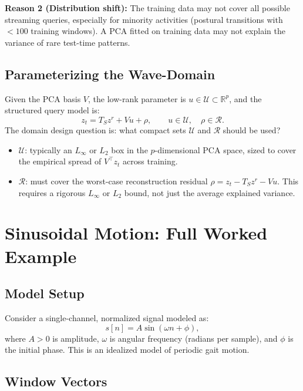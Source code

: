 \documentclass[11pt, a4paper]{article}
\theoremstyle{definition}
\theoremstyle{plain}
\newcommand{\R}{\mathbb{R}}
\begin{document}
\textbf{Reason 2 (Distribution shift):} The training data may not cover all possible
streaming queries, especially for minority activities (postural transitions with
$< 100$ training windows). A PCA fitted on training data may not explain the variance
of rare test-time patterns.

\subsection{Parameterizing the Wave-Domain}

Given the PCA basis $V$, the low-rank parameter is $u \in \mathcal{U} \subset \R^p$,
and the structured query model is:
\[
  z_t = T_S z^r + Vu + \rho, \qquad u \in \mathcal{U}, \quad \rho \in \mathcal{R}.
\]
The domain design question is: what compact sets $\mathcal{U}$ and $\mathcal{R}$ should be used?

\begin{itemize}[leftmargin=1.5em]
  \item $\mathcal{U}$: typically an $L_\infty$ or $L_2$ box in the $p$-dimensional
        PCA space, sized to cover the empirical spread of $V^\top z_t$ across training.
  \item $\mathcal{R}$: must cover the worst-case reconstruction residual
        $\rho = z_t - T_S z^r - V u$. This requires a rigorous $L_\infty$ or $L_2$
        bound, not just the average explained variance.
\end{itemize}

\section{Sinusoidal Motion: Full Worked Example}

\subsection{Model Setup}

Consider a single-channel, normalized signal modeled as:
\[
  s[n] = A \sin(\omega n + \phi),
\]
where $A > 0$ is amplitude, $\omega$ is angular frequency (radians per sample),
and $\phi$ is the initial phase. This is an idealized model of periodic gait motion.

\subsection{Window Vectors}
\end{document}
